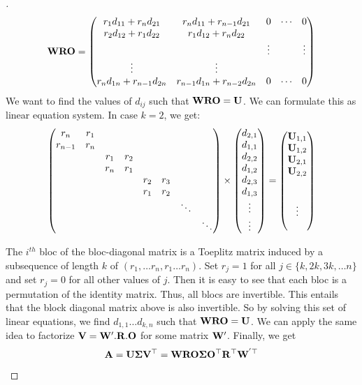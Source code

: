 \begin{proof}[]
\begin{equation}
  \mathbf{W}\mathbf{R}\mathbf{O} = \begin{pmatrix}
  r_{1}d_{11}+r_{n}d_{21} & r_{n}d_{11}+r_{n-1}d_{21} & 0 & \cdots & 0 \\
  r_{2}d_{12}+r_{1}d_{22} & r_{1}d_{12}+r_{n}d_{22}\\
   &  & \vdots &  & \vdots \\
  \vdots & \vdots\\
  r_{n}d_{1n}+r_{n-1}d_{2n} & r_{n-1}d_{1n}+r_{n-2}d_{2n} & 0 & \cdots & 0
  \end{pmatrix}
\end{equation}
We want to find the values of $d_{ij}$ such that $\mathbf{W} \mathbf{R} \mathbf{O} = \mathbf{U}$. We can formulate this as linear equation system. In case $k=2$, we get:
\begin{equation}
  \begin{pmatrix}
  r_{n} & r_{1}\\
  r_{n-1} & r_{n}\\
   &  & r_{1} & r_{2}\\
   &  & r_{n} & r_{1}\\
   &  &  &  & r_{2} & r_{3}\\
   &  &  &  & r_{1} & r_{2}\\
   &  &  &  &  &  & \ddots\\
   &  &  &  &  &  &  & \ddots
  \end{pmatrix} \times \begin{pmatrix}
  d_{2,1}\\
  d_{1,1}\\
  d_{2,2}\\
  d_{1,2}\\
  d_{2,3}\\
  d_{1,3}\\
  \vdots\\
  \vdots
  \end{pmatrix} = \begin{pmatrix}
  \mathbf{U}_{1,1}\\
  \mathbf{U}_{1,2}\\
  \mathbf{U}_{2,1}\\
  \mathbf{U}_{2,2}\\
  \\
  \\
  \vdots\\
  \\
  \end{pmatrix}
\end{equation}

The $i^{th}$ bloc of the bloc-diagonal matrix is a Toeplitz matrix induced by a subsequence of length $k$ of $(r_1,\ldots r_n,r_1 \ldots r_n)$.
Set $r_{j}=1$ for all $j\in\{k,2k,3k,\ldots n\}$ and set $r_{j}=0$ for all other values of $j$.
Then it is easy to see that each bloc is a permutation of the identity matrix.
Thus, all blocs are invertible.
This entails that the block diagonal matrix above is also invertible.
So by solving this set of linear equations, we find $d_{1,1}\ldots d_{k,n}$ such that $\mathbf{W}\mathbf{R}\mathbf{O}=\mathbf{U}$.
We can apply the same idea to factorize $\mathbf{V}=\mathbf{W}'.\mathbf{R}.\mathbf{O}$ for some matrix $\mathbf{W}'$.
Finally, we get 
\begin{equation}
  \mathbf{A} = \mathbf{U} \mathbf{\Sigma} \mathbf{V}^\top = \mathbf{W}\mathbf{R}\mathbf{O} \mathbf{\Sigma} \mathbf{O}^\top \mathbf{R}^\top \mathbf{W}^{'\top}
\end{equation}


\end{proof}
